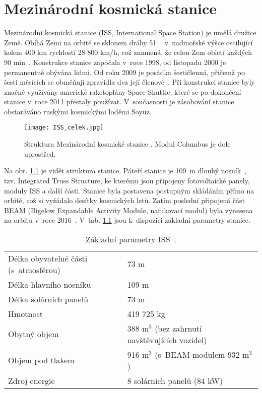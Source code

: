 %
\chapter{Mezinárodní kosmická stanice}
Mezinárodní kosmická stanice (ISS, International Space Station) je umělá družice Země. Obíhá Zemi na orbitě se sklonem dráhy 51$^{\circ}$~\cite{ISS_wiki} v~nadmořské výšce oscilující kolem 400 km rychlostí 28 800 km/h, což znamená, že celou Zem obletí každých 90 min~\cite{ISS_where}. Konstrukce stanice započala v~roce 1998, od listopadu 2000 je permanentně obývána lidmi. Od roku 2009 je posádka šestičlenná, přičemž po šesti měsících se obměňují zpravidla dva její členové~\cite{ISS_wiki}. Při konstrukci stanice byly značně využívány americké raketoplány Space Shuttle, které se po dokončení stanice v~roce 2011 přestaly používat. V~současnosti je zásobování stanice obstaráváno ruskými kosmickými loděmi Soyuz.
\begin{figure}[H]
  \centering
  \texttt{[image: ISS\_celek.jpg]}
  \caption{Struktura Mezinárodní kosmické stanice \cite{ISS_facts}. Modul Columbus je dole uprostřed.}
  \label{fig:ISS_celek}
\end{figure}

Na obr. \ref{fig:ISS_celek} je vidět struktura stanice. Páteří stanice je 109~m dlouhý nosník~\cite{ISS_facts}, tzv. Integrated Truss Structure, ke kterému jsou připojeny fotovoltaické panely, moduly ISS a další části. Stanice byla postavena postupným skládáním přímo na orbitě, což si vyžádalo desítky kosmických letů. Zatím poslední připojená část BEAM (Bigelow Expandable Activity Module, nafukovací modul) byla vynesena na orbitu v~roce 2016~\cite{ISS_gifs}. V~tab. \ref{tab:ISS_parametry} jsou k~dispozici základní parametry stanice.
\begin{table}[h]
  \centering
  \caption{Základní parametry ISS~\cite{ISS_facts}.}
  \label{tab:ISS_parametry}
  \begin{tabular}{ll}
    \toprule
    Délka obyvatelné části (s~atmosférou)&73 m\\
    Délka hlavního nosníku&109 m\\
    Délka solárních panelů&73 m\\
    Hmotnost&419 725 kg\\
    Obytný objem& 388 m$^3$ (bez zahrnutí navštěvujících vozidel)\\
    Objem pod tlakem&916 m$^3$ (s~BEAM modulem 932 m$^3$)\\
    Zdroj energie& 8 solárních panelů (84 kW)\\
    \bottomrule
  \end{tabular}
\end{table}

